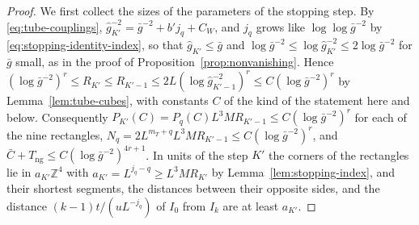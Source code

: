 \documentclass[11pt]{preprint}
\numberwithin{equation}{section}
\theoremstyle{definition}
\theoremstyle{remark}
\theoremstyle{plain}
\begin{document}
\begin{proof}
We first collect the sizes of the parameters of the stopping step. By \eqref{eq:tube-couplings}, $\hat g_{K'}^{-2} = \bar g^{-2} + b'j_q + C_W$, and $j_q$ grows like $\log\log\bar g^{-2}$ by \eqref{eq:stopping-identity-index}, so that $\hat g_{K'} \leq \bar g$ and $\log\bar g^{-2} \leq \log\hat g_{K'}^{-2} \leq 2\log\bar g^{-2}$ for $\bar g$ small, as in the proof of Proposition~\ref{prop:nonvanishing}. Hence $(\log\bar g^{-2})^r \leq R_{K'} \leq R_{K'-1} \leq 2L(\log\hat g_{K'-1}^{-2})^r \leq C(\log\bar g^{-2})^r$ by Lemma~\ref{lem:tube-cubes}, with constants $C$ of the kind of the statement here and below. Consequently $P_{K'}(C) = P_q(C)L^3MR_{K'-1} \leq C(\log\bar g^{-2})^r$ for each of the nine rectangles, $N_q = 2L^{m_T+q}L^3MR_{K'-1} \leq C(\log\bar g^{-2})^r$, and $\bar C + T_{\mathrm{ng}} \leq C(\log\bar g^{-2})^{4r+1}$. In units of the step $K'$ the corners of the rectangles lie in $a_{K'}\mathbb Z^4$ with $a_{K'} = L^{j_q-q} \geq L^3MR_{K'}$ by Lemma~\ref{lem:stopping-index}, and their shortest segments, the distances between their opposite sides, and the distance $(k - 1)t/(uL^{-j_q})$ of $I_0$ from $I_k$ are at least $a_{K'}$.


\end{proof}
\end{document}

